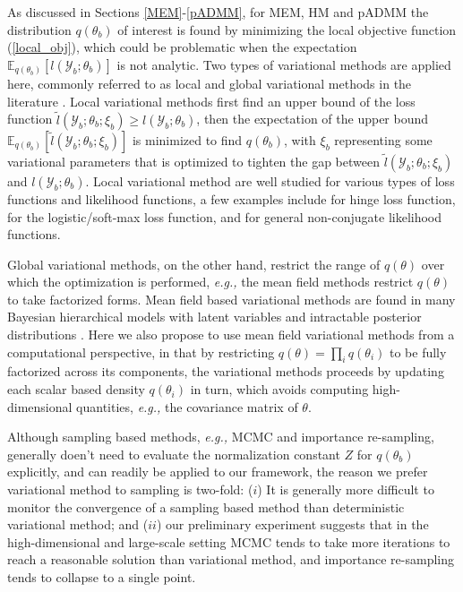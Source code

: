 \documentclass{article}
\newcommand{\eg}[0]{\emph{e.g., }}
\newcommand{\1}[0]{\ensuremath{\boldsymbol{1}}\xspace}
\begin{document}
As discussed in Sections \ref{MEM}-\ref{pADMM}, for MEM, HM and pADMM the distribution $q(\theta_b)$ of interest is found by minimizing the local objective function (\ref{local_obj}), which could be problematic when the expectation $\mathbb{E}_{q(\theta_b)}[l(\mathcal{Y}_b; \theta_b)]$ is not analytic. Two types of variational methods are applied here, commonly referred to as local and global variational methods in the literature \cite{Bishop2006}. Local variational methods first find an upper bound of the loss function $\tilde l(\mathcal{Y}_b; \theta_b; \xi_b) \ge  l(\mathcal{Y}_b; \theta_b)$, then the expectation of the upper bound $\mathbb{E}_{q(\theta_b)}[\tilde l(\mathcal{Y}_b; \theta_b; \xi_b)]$ is minimized to find $q(\theta_b)$, with $\xi_b$ representing some variational parameters that is optimized to tighten the gap between $\tilde l(\mathcal{Y}_b; \theta_b; \xi_b)$ and $l(\mathcal{Y}_b; \theta_b)$. Local variational method are well studied for various types of loss functions and likelihood functions, a few examples include \cite{Zhu2012} for hinge loss function, \cite{Jaakkola2000, Khan2010} for the logistic/soft-max loss function, and \cite{Khan2013, Wang2013} for general non-conjugate likelihood functions. 

Global variational methods, on the other hand, restrict the range of $q(\theta)$ over which the optimization is performed, \eg the mean field methods restrict $q(\theta)$ to take factorized forms. Mean field based variational methods are found in many Bayesian hierarchical models with latent variables and intractable posterior distributions \cite{Wainwright2008}. Here we also propose to use mean field variational methods from a computational perspective, in that by restricting $q(\theta) = \prod_i q(\theta_i)$ to be fully factorized across its components, the variational methods proceeds by updating each scalar based density $q(\theta_i)$ in turn, which avoids computing high-dimensional quantities, \eg the covariance matrix of $\theta$.

Although sampling based methods, \eg MCMC and importance re-sampling, generally doen't need to evaluate the normalization constant $Z$ for $q(\theta_b)$ explicitly, and can readily be applied to our framework, the reason we prefer variational method to sampling is two-fold: ($i$) It is generally more difficult to monitor the convergence of a sampling based method than deterministic variational method; and ($ii$) our preliminary experiment suggests that in the high-dimensional and large-scale setting MCMC tends to take more iterations to reach a reasonable solution than variational method, and importance re-sampling tends to collapse to a single point.
\end{document}
